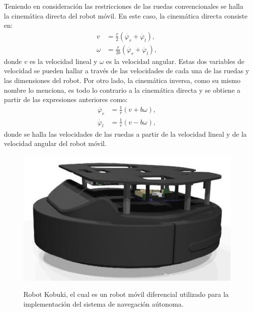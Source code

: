 
Teniendo en consideración las restricciones de las ruedas convencionales se halla la 
cinemática directa del robot móvil. En este caso, la cinemática directa consiste en:
\begin{align*}
v &= \frac{r}{2}(\dot{\varphi_{r}} + \dot{\varphi_{l}}), \\
\omega &= \frac{r}{2b}(\dot{\varphi_{r}} + \dot{\varphi_{l}}),
\end{align*}
donde $v$ es la velocidad lineal y $\omega$ es la velocidad angular. Estas 
dos variables de velocidad se pueden hallar a través de las velocidades
de cada una de las ruedas y las dimensiones del robot. Por otro lado, la cinemática 
inversa, como su mismo nombre lo menciona, es todo lo contrario a la
cinemática directa y se obtiene a partir de las expresiones anteriores como: 
\begin{align*}
\dot{\varphi_{r}} &= \frac{1}{r}(v + b\omega), \\
\dot{\varphi_{l}} &= \frac{1}{r}(v - b\omega),
\end{align*}
donde se halla las velocidades de las ruedas a partir de la velocidad lineal y de la
velocidad angular del robot móvil.
\begin{figure}%
 \centering \footnotesize
 {\includegraphics[width=0.35\linewidth]{images/turtlebot.jpg}}
 \captionsetup{font=footnotesize}
 \caption{Robot Kobuki, el cual es un robot móvil diferencial utilizado para la 
 implementación del sistema de navegación aútonoma.}
 \label{fig:kobuki}
 \end{figure}

